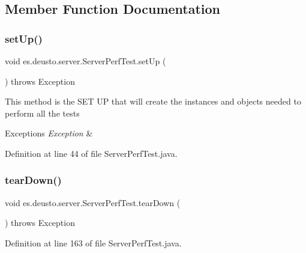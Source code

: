 \subsection{Member Function Documentation}
\mbox{\label{classes_1_1deusto_1_1server_1_1_server_perf_test_a4e78c4f805d8f61c1f23f55dc5b9fe00}} 
\subsubsection{\texorpdfstring{set\+Up()}{setUp()}}
{\footnotesize\ttfamily void es.\+deusto.\+server.\+Server\+Perf\+Test.\+set\+Up (\begin{DoxyParamCaption}{ }\end{DoxyParamCaption}) throws Exception}

This method is the S\+ET UP that will create the instances and objects needed to perform all the tests 
\begin{DoxyExceptions}{Exceptions}
{\em Exception} & \\
\hline
\end{DoxyExceptions}


Definition at line 44 of file Server\+Perf\+Test.\+java.

\mbox{\label{classes_1_1deusto_1_1server_1_1_server_perf_test_a81109436602a11e6c7b5221d4b004f9b}} 
\subsubsection{\texorpdfstring{tear\+Down()}{tearDown()}}
{\footnotesize\ttfamily void es.\+deusto.\+server.\+Server\+Perf\+Test.\+tear\+Down (\begin{DoxyParamCaption}{ }\end{DoxyParamCaption}) throws Exception}



Definition at line 163 of file Server\+Perf\+Test.\+java.

